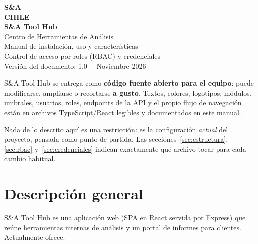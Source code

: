 \documentclass[11pt,a4paper]{article}
\begin{document}
\begin{titlepage}
  \centering
  \vspace*{3cm}
  {\fontsize{40}{48}\selectfont\bfseries\color{sablue} S\&A}\\[2pt]
  {\large\bfseries\color{sablue} CHILE}\\[1.5cm]
  {\Huge\bfseries\color{sanavy} S\&A Tool Hub}\\[0.4cm]
  {\Large Centro de Herramientas de Análisis}\\[1.8cm]
  {\large Manual de instalación, uso y características}\\[0.3cm]
  {\large Control de acceso por roles (RBAC) y credenciales}\\
  \vfill
  {\small Versión del documento: 1.0 \quad---\quad Noviembre 2026}
\end{titlepage}

\begin{tcolorbox}[colback=salight,colframe=sablue,fonttitle=\bfseries\large,
  title={Este software es completamente modificable},arc=2mm]
S\&A Tool Hub se entrega como \textbf{código fuente abierto para el equipo}: puede
modificarse, ampliarse o recortarse \textbf{a gusto}. Textos, colores, logotipos,
módulos, umbrales, usuarios, roles, endpoints de la API y el propio flujo de navegación
están en archivos TypeScript/React legibles y documentados en este manual.

Nada de lo descrito aquí es una restricción: es la configuración \emph{actual} del
proyecto, pensada como punto de partida. Las secciones~\ref{sec:estructura},
\ref{sec:rbac} y~\ref{sec:credenciales} indican exactamente qué archivo tocar para
cada cambio habitual.
\end{tcolorbox}

\vspace{0.6cm}
\tableofcontents
\newpage

\section{Descripción general}

S\&A Tool Hub es una aplicación web (SPA en React servida por Express) que reúne
herramientas internas de análisis y un portal de informes para clientes. Actualmente
ofrece:
\end{document}
